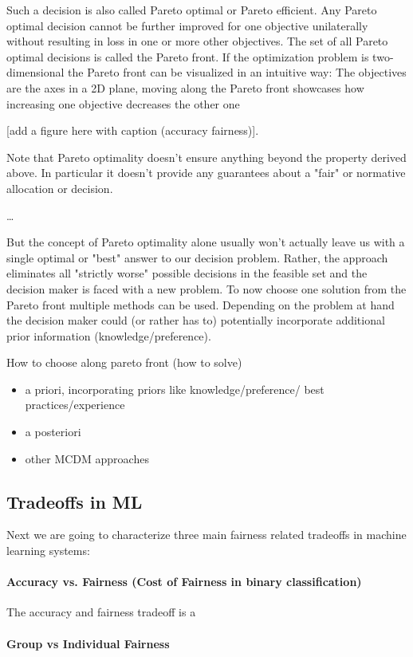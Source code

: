	Such a decision is also called Pareto optimal or Pareto efficient.
	Any Pareto optimal decision cannot be further improved for one objective unilaterally without resulting in loss in one or more other objectives.
	The set of all Pareto optimal decisions is called the Pareto front.
	If the optimization problem is two-dimensional the Pareto front can be visualized in an intuitive way:
	The objectives are the axes in a 2D plane, moving along the Pareto front showcases how increasing one objective decreases the other one

	[add a figure here with caption (accuracy fairness)].

	Note that Pareto optimality doesn't ensure anything beyond the property derived above.
	In particular it doesn't provide any guarantees about a "fair" or normative allocation or decision.

	\dots

	But the concept of Pareto optimality alone usually won't actually leave us with a single optimal or "best" answer to our decision problem.
	Rather, the approach eliminates all "strictly worse" possible decisions in the feasible set and the decision maker is faced with a new problem.
	To now choose one solution from the Pareto front multiple methods can be used.
	Depending on the problem at hand the decision maker could (or rather has to) potentially incorporate additional prior information (knowledge/preference).

	How to choose along pareto front (how to solve)

	\begin{itemize}
	\item a priori, incorporating priors like knowledge/preference/ 
	best practices/experience
	\item a posteriori
	\item other MCDM approaches
	\end{itemize}


	\subsection{Tradeoffs in ML}
	Next we are going to characterize three main fairness related tradeoffs in machine learning systems:
	\paragraph{Accuracy vs. Fairness (Cost of Fairness in binary classification)}
	The accuracy and fairness tradeoff is a 
	\paragraph{Group vs Individual Fairness}
	
